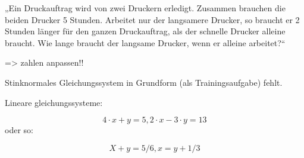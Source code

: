  

„Ein Druckauftrag wird von zwei Druckern erledigt. Zusammen brauchen die beiden Drucker 5 Stunden. Arbeitet nur der langsamere Drucker, so braucht er 2 Stunden länger für den ganzen Druckauftrag, als der schnelle Drucker alleine braucht. Wie lange braucht der langsame Drucker, wenn er alleine arbeitet?“ 

=> zahlen anpassen!!



Stinknormales Gleichungssystem in Grundform (als Trainingsaufgabe)
fehlt.

Lineare gleichungssysteme: 

$$4\cdot{}x+y=5, 2\cdot{}x-3\cdot{}y=13$$
oder so:

$$X+y=5/6, x=y+1/3 $$




